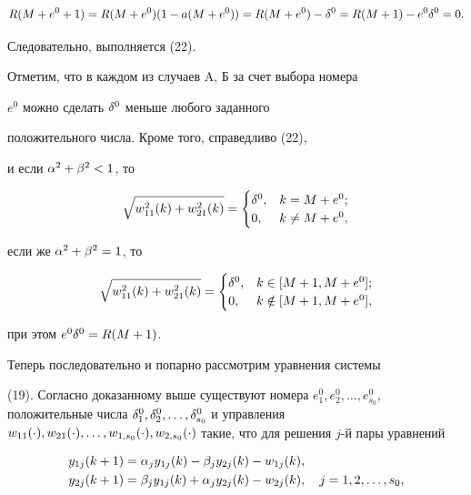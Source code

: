$$


R(M+e^0+1) = R(M+e^0)(1-a(M+e^0)) = R(M+e^0) - \d^0 = R(M+1) -


e^0\d^0 = 0.


$$


Следовательно, выполняется (22).





Отметим, что в каждом из случаев A, Б за счет выбора номера


$e^0 $ можно сделать $\delta^0 $ меньше любого заданного


положительного числа. Кроме того, справедливо (22), 


и если $\alpha^2 + \beta^2 < 1$, то


$$


\sqrt{w_{11}^2(k)+ w_{21}^2(k)} =


\begin{cases}


 \d^0, & k = M+e^0;\\


 0, & k \neq M+e^0,


\end{cases}


$$


если же $\alpha^2 + \beta^2 = 1$, то


$$


\sqrt{w_{11}^2(k)+ w_{21}^2(k)} =


\begin{cases}


 \d^0, & k \in [M+1, M+e^0];\\


 0, & k \notin [M+1, M+e^0],


\end{cases}


$$


при этом $e^0\delta^0 = R(M+1)$.





Теперь последовательно и попарно рассмотрим уравнения системы


(19). Согласно доказанному выше существуют номера $e_1^0,


e_2^0,\dotsc, e_{s_0}^0$, положительные числа $\d_1^0, \d_2^0,\dotsc,


\d_{s_0}^0$ и управления $w_{11}(\cc), w_{21}(\cc),\dotsc,w_{1,s_0}(\cc),


w_{2,s_0}(\cc)$ такие, что для решения $j$-й пары уравнений


\begin{align*}


y_{1j}(k+1) &= \a_j y_{1j}(k)- \b_j y_{2j}(k) - w_{1j}(k),\\


y_{2j}(k+1) &= \b_j y_{1j}(k)+ \a_j y_{2j}(k) - w_{2j}(k),


\quad j =1, 2, \dotsc,s_0, 


\end{align*}


